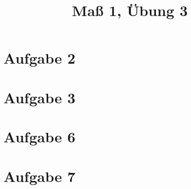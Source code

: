\documentclass[]{article}
\author{}
\title{Maß 1, Übung 3}
\begin{document}
    \begin{titlepage}
        \maketitle
    \end{titlepage}
    
    \section{Aufgabe 2}
    
    \section{Aufgabe 3}
    
    \section{Aufgabe 6}
    
    \section{Aufgabe 7}
    

    
    
\end{document}
